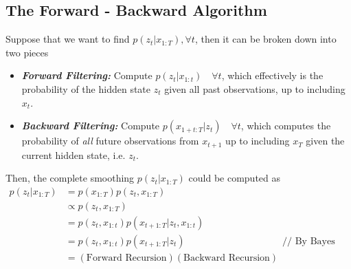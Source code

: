 \documentclass[11pt]{article}
\begin{document}
\subsection{The Forward - Backward Algorithm}
Suppose that we want to find $p(z_t | x_{1:T}), \forall t$, then it can be broken down into two pieces
\begin{itemize}
    \item \textit{\textbf{Forward Filtering:}} Compute $p\left(z_{t} | x_{1: t}\right) \quad \forall t$, which effectively is the probability of the hidden state $z_t$ given all past observations, up to including $x_t$. 
    \item \textbf{\textit{Backward Filtering:}} Compute $p\left(x_{1+t: T} | z_{t}\right)\quad \forall t$, which computes the probability of \textit{all} future observations from $x_{t+1}$ up to including $x_T$ given the current hidden state, i.e. $z_t$.
\end{itemize}
Then, the complete smoothing $p(z_t | x_{1:T})$ could be computed as
\begin{align*}
    p\left(z_{t} | x_{1: T}\right)
    &= p\left(x_{1:T}\right)p\left(z_{t}, x_{1: T}\right) \\
    &\propto p\left(z_{t}, x_{1: T}\right) \\
    &=p\left(z_{t}, x_{1: t}\right) p\left(x_{t+1: T} | z_{t}, x_{1: t}\right) \\
    &=p\left(z_{t}, x_{1: t}\right) p\left(x_{t+1: T} | z_{t}\right) && \text{// By Bayes Ball} \\
    &=(\text{Forward Recursion})(\text{Backward Recursion})
\end{align*}
\end{document}
